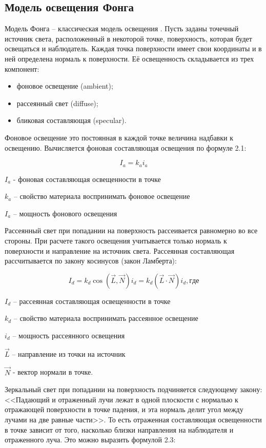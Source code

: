 \subsection{Модель освещения Фонга}
Модель Фонга -- классическая модель освещения \cite{bib11}. Пусть заданы точечный источник света, расположенный в некоторой точке, поверхность, которая будет освещаться и наблюдатель. Каждая точка поверхности имеет свои координаты и в ней определена нормаль к поверхности. Её освещенность складывается из трех компонент:
\begin{itemize}
	\item фоновое освещение (ambient);
	\item рассеянный свет (diffuse);
	\item бликовая составляющая (specular). 
\end{itemize}

Фоновое освещение это постоянная в каждой точке величина надбавки к освещению. Вычисляется фоновая составляющая освещения по формуле 2.1:

\begin{equation}
I_a = k_a i_a
\end{equation}

$I_a$ - фоновая составляющая освещенности в точке

$k_a$ – свойство материала воспринимать фоновое освещение

$I_a$ – мощность фонового освещения
\newline

Рассеянный свет при попадании на поверхность рассеивается равномерно во все стороны. При расчете такого освещения учитывается только нормаль к поверхности и направление на источник света. Рассеянная составляющая рассчитывается по закону косинусов (закон Ламберта):

\begin{equation}
I_d=k_d {\cos{(\vec{L},\vec{N})}}i_d=k_d(\vec{L}\cdot\vec{N})i_d, где
\end{equation}

$I_d$ – рассеянная составляющая освещенности в точке

$k_d$ – свойство материала воспринимать рассеянное освещение

$i_d$ – мощность рассеянного освещения

$\vec{L}$ – направление из точки на источник

$\vec{N}$ - вектор нормали в точке.
\newline

Зеркальный свет при попадании на поверхность подчиняется следующему закону: <<Падающий и отраженный лучи лежат в одной плоскости с нормалью к отражающей поверхности в точке падения, и эта нормаль делит угол между лучами на две равные части>>. То есть отраженная составляющая освещенности в точке зависит от того, насколько близки направления на наблюдателя и отраженного луча. Это можно выразить формулой 2.3:

